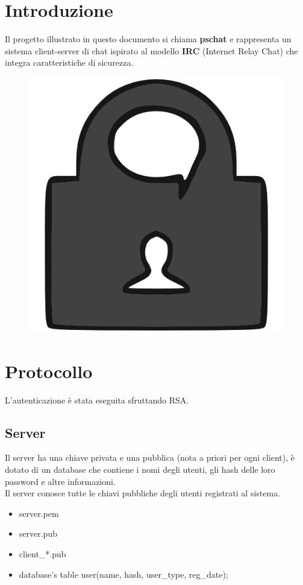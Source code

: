 \documentclass[a4paper,titlepage]{article}
\begin{document}
\section*{Introduzione}  \thispagestyle{plain}
Il progetto illustrato in questo documento si chiama \textbf{pschat} e rappresenta un sistema client-server di chat ispirato al modello \textbf{IRC} (Internet Relay Chat) che integra caratteristiche di sicurezza.\\
\begin{figure}[H]
  \centering \includegraphics[scale=1.0]{../data/psc_orig.png}
\end{figure}

\section{Protocollo}
L'autenticazione è stata eseguita sfruttando RSA.
\subsection{Server}
Il server ha una chiave privata e una pubblica (nota a priori per ogni client), è dotato di un database che contiene i nomi degli utenti, gli hash delle loro password e altre informazioni.\\
Il server conosce tutte le chiavi pubbliche degli utenti registrati al sistema.
\begin{itemize}
\item server.pem
\item server.pub
\item client\_*.pub
\item database's table user(name, hash, user\_type, reg\_date);
\end{itemize}
\end{document}
